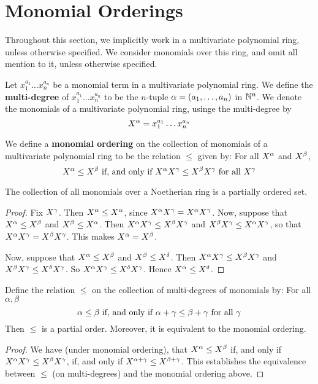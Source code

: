 \section{Monomial Orderings}
\label{section_7.5}

Throughout this section, we implicitly work in a multivariate
polynomial ring, unless otherwise specified. We consider monomials
over this ring, and omit all mention to it, unless otherwise
specified.

\begin{definition}
  Let $x_1^{a_1} \dots x_n^{a_n}$ be a monomial term in a multivariate
  polynomial ring. We define the \textbf{multi-degree} of $x_1^{a_1} \dots
  x_n^{a_n}$ to be the $n$-tuple $\alpha=(a_1, \dots, a_n)$ in $\mathbb{N}^n$. We
  denote the monomials of a multivariate polynomial ring, usinge the
  multi-degree by
  \begin{equation*}
    X^\alpha=x_1^{a_1} \dots x_n^{a_n}
  \end{equation*}
\end{definition}

\begin{definition}
  We define a \textbf{monomial ordering} on the collection of
  monomials of a multivariate polynomial ring to be the relation
  $\leq$ given by: For all $X^\alpha$ and  $X^\beta$,
  \begin{equation*}
    X^\alpha \leq X^\beta \text{ if, and only if }
    X^\alpha X^\gamma \leq X^\beta X^\gamma \text{ for all } X^\gamma
  \end{equation*}
\end{definition}

\begin{lemma}\label{lemma_7.5.1}
  The collection of all monomials over a Noetherian ring is a
  partially ordered set.
\end{lemma}
\begin{proof}
  Fix $X^\gamma$. Then  $X^\alpha \leq X^\alpha$, since $X^\alpha X^\gamma=X^\alpha X^\gamma$.
  Now, suppose that  $X^\alpha \leq X^\beta$ and $X^\beta \leq X^\alpha$. Then $X^\alpha
  X^\gamma \leq X^\beta X^\gamma$  and $X^\beta X^\gamma \leq X^\alpha X^\gamma$, so that
  $X^\alpha X^\gamma=X^\beta X^\gamma$. This makes $X^\alpha=X^\beta$.

  Now, suppose that $X^\alpha \leq X^\beta$ and $X^\beta \leq X^\delta$. Then $X^\alpha
  X^\gamma \leq X^\beta X^\gamma$ and $X^\beta X^\gamma \leq X^\delta X^\gamma$. So
  $X^\alpha X^\gamma \leq X^\delta X^\gamma$. Hence $X^\alpha \leq X^\delta$.
\end{proof}
\begin{corollary}
  Define the relation $\leq$ on the collection of multi-degrees of
  monomials by: For all $\alpha, \beta$
  \begin{equation*}
    \alpha \leq \beta \text{ if, and only if }
    \alpha+\gamma \leq \beta+\gamma \text{ for all } \gamma
  \end{equation*}
  Then $\leq$ is a partial order. Moreover, it is equivalent to the
  monomial ordering.
\end{corollary}
\begin{proof}
  We have (under monomial ordering), that $X^\alpha \leq X^\beta$ if, and only
  if $X^\alpha X^\gamma \leq X^\beta X^\gamma$, if, and only if $X^{\alpha+\gamma} \leq X^{\beta+\gamma}$.
  This establishes the equivalence between $\leq$ (on multi-degrees)
  and the monomial ordering above.
\end{proof}

